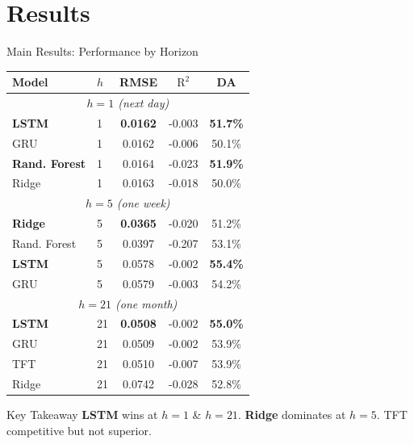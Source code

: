 \documentclass[aspectratio=169,xcolor={dvipsnames}]{beamer}
\newcommand{\rTwo}{\ensuremath{\mathrm{R}^2}}
\begin{document}
\section{Results}

\begin{frame}{Main Results: Performance by Horizon}
  \begin{center}
    \scriptsize
    \begin{tabular}{llccc}
      \toprule
      \textbf{Model} & \textbf{$h$} & \textbf{RMSE} & \textbf{$\rTwo$} & \textbf{DA} \\
      \midrule
      \multicolumn{5}{c}{\textit{$h=1$ (next day)}} \\
      \textbf{LSTM} & 1 & \textbf{0.0162} & -0.003 & \textbf{51.7\%} \\
      GRU & 1 & 0.0162 & -0.006 & 50.1\% \\
      \textbf{Rand. Forest} & 1 & 0.0164 & -0.023 & \textbf{51.9\%} \\
      Ridge & 1 & 0.0163 & -0.018 & 50.0\% \\
      \midrule
      \multicolumn{5}{c}{\textit{$h=5$ (one week)}} \\
      \textbf{Ridge} & 5 & \textbf{0.0365} & -0.020 & 51.2\% \\
      Rand. Forest & 5 & 0.0397 & -0.207 & 53.1\% \\
      \textbf{LSTM} & 5 & 0.0578 & -0.002 & \textbf{55.4\%} \\
      GRU & 5 & 0.0579 & -0.003 & 54.2\% \\
      \midrule
      \multicolumn{5}{c}{\textit{$h=21$ (one month)}} \\
      \textbf{LSTM} & 21 & \textbf{0.0508} & -0.002 & \textbf{55.0\%} \\
      GRU & 21 & 0.0509 & -0.002 & 53.9\% \\
      TFT & 21 & 0.0510 & -0.007 & 53.9\% \\
      Ridge & 21 & 0.0742 & -0.028 & 52.8\% \\
      \bottomrule
    \end{tabular}
  \end{center}
  
  \vspace{0.2cm}
  
  \begin{alertblock}{Key Takeaway}
    \small
    \textbf{LSTM} wins at $h=1$ \& $h=21$. \textbf{Ridge} dominates at $h=5$. TFT competitive but not superior.
  \end{alertblock}
\end{frame}
\end{document}

